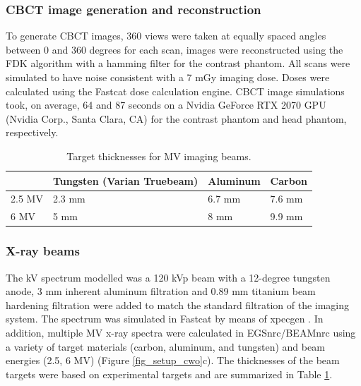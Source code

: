 \subsubsection{CBCT image generation and reconstruction}

 To generate CBCT images, 360 views were taken at equally spaced angles between 0 and 360 degrees for each scan, images were reconstructed using the FDK algorithm \cite{Feldkamp1984PracticalAlgorithm} with a hamming filter for the contrast phantom. All scans were simulated to have noise consistent with a 7 mGy imaging dose. Doses were calculated using the Fastcat dose calculation engine. CBCT image simulations took, on average, 64 and 87 seconds on a Nvidia GeForce RTX 2070 GPU (Nvidia Corp., Santa Clara, CA) for the contrast phantom and head phantom, respectively.


\begin{table}[h!]
\begin{center}
\caption{Target thicknesses for MV imaging beams.}
\label{tab:targets}
\begin{tabular}{llll}
 \hline
       & Tungsten (Varian Truebeam) & Aluminum & Carbon \\  \hline
2.5 MV & 2.3 mm   & 6.7 mm \cite{Parsons2014AVirtuaLinac} & 7.6 mm \cite{Parsons2012BeamTargets}\\
6 MV   & 5 mm     & 8 mm \cite{Baek2019AssessmentFilter}     & 9.9 mm \cite{Parsons2012BeamTargets}
\end{tabular}
\end{center}
\end{table}

\subsubsection{X-ray beams}

 The kV spectrum modelled was a 120 kVp beam with a 12-degree tungsten anode, 3 mm inherent aluminum filtration and 0.89 mm titanium beam hardening filtration were added to match the standard filtration of the imaging system. The spectrum was simulated in Fastcat by means of xpecgen \cite{Hernandez2016Xpecgen:Anodes}. In addition, multiple MV x-ray spectra were calculated in EGSnrc/BEAMnrc \cite{IKawrakow2018TheTransport} using a variety of target materials (carbon, aluminum, and tungsten) and beam energies (2.5, 6 MV) (Figure \ref{fig_setup_cwo}c). The thicknesses of the beam targets were based on experimental targets and are summarized in Table \ref{tab:targets}. 


